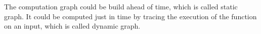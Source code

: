 The computation graph could be build ahead of time, which is called static graph. It could be computed just in time by tracing the execution of the function on an input, which is called dynamic graph.


















































































































